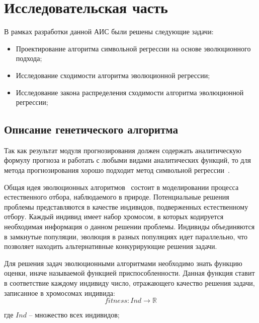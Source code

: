 \section{Исследовательская часть}

В рамках разработки данной АИС были решены следующие задачи:
\begin{itemize}
\item Проектирование алгоритма символьной регрессии на основе эволюционного подхода;
\item Исследование сходимости алгоритма эволюционной регрессии;
\item Исследование закона распределения сходимости алгоритма эволюционной регрессии;
\end{itemize}

\subsection{Описание генетического алгоритма}

Так как результат модуля прогнозирования должен содержать аналитическую формулу прогноза и работать с любыми видами аналитических функций, то для метода прогнозирования хорошо подходит метод символьной регрессии~\cite{SymbolicRegression}.

Общая идея эволюционных алгоритмов~\cite{KozaTheBase} состоит в моделировании процесса естественного отбора, наблюдаемого в природе. Потенциальные решения проблемы представляются в качестве индивидов, подверженных естественному отбору. Каждый индивид имеет набор хромосом, в которых кодируется необходимая информация о данном решении проблемы. Индивиды объединяются в замкнутые популяции, эволюция в разных популяциях идет параллельно, что позволяет находить альтернативные конкурирующие решения задачи.

Для решения задач эволюционными алгоритмами необходимо знать функцию оценки, иначе называемой функцией приспособленности. Данная функция ставит в соответствие каждому индивиду число, отражающего качество решения задачи, записанное в хромосомах индивида:
\begin{equation}
\label{equation:fitness}
fitness : Ind \rightarrow \mathbb{R}
\end{equation}
\begin{ESKDExplanation}
\item[где ] $Ind$ -- множество всех индивидов;
\end{ESKDExplanation}

